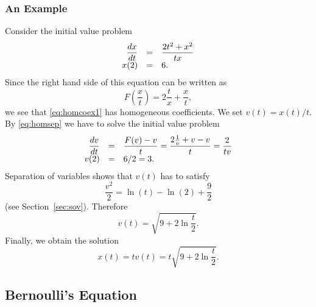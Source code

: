 \documentclass{ximera}
\begin{document}
\subsubsection*{An Example}
Consider the initial value problem
\begin{equation}
\label{eq:homcoex1}
\begin{array}{rcl}
\displaystyle \frac{dx}{dt} & = & \displaystyle \frac{2t^2+x^2}{tx} \\
x(2) & = & 6.
\end{array}
\end{equation}
{\rm Since the right hand side of this equation can be written as
\[
F\left(\frac{x}{t}\right) = 2\frac{t}{x}+\frac{x}{t},
\]
we see that \eqref{eq:homcoex1} has homogeneous 
coefficients.  We
set $v(t) = x(t)/t$. By \eqref{eq:homsep} we have to solve the
initial value problem
\[
\begin{array}{rcl}
\displaystyle \frac{dv}{dt} & = & \displaystyle \frac{F(v)-v}{t} = 
\frac{2\frac{1}{v}+v-v}{t}=\frac{2}{tv} \\
v(2) & = & 6/2 = 3.
\end{array}
\]
Separation of variables  shows that 
$v(t)$ has to satisfy
\[
\frac{v^2}{2} = \ln(t) - \ln(2) + \frac{9}{2}
\]
(see Section~\ref{sec:sov}). Therefore
\[
v(t) = \sqrt{9+2\ln\frac{t}{2}}.
\]
Finally, we obtain the solution
\[
x(t) = tv(t) = t\sqrt{9+2\ln\frac{t}{2}}.
\]}

\subsection*{Bernoulli's Equation}
\end{document}
